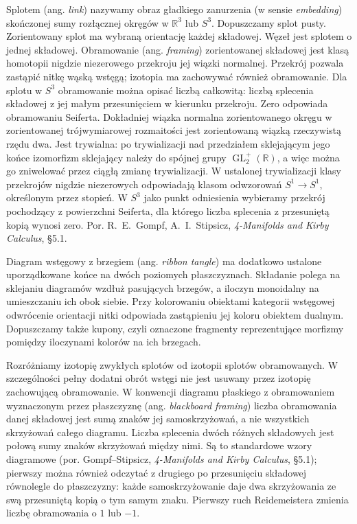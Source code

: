 \begin{definicja}\label{cat:def:tf-framed-tangle}
Splotem (ang. \emph{link}) nazywamy obraz gładkiego zanurzenia (w sensie \emph{embedding}) skończonej sumy rozłącznej okręgów w $\mathbb R^3$ lub $S^3$. Dopuszczamy splot pusty. Zorientowany splot ma wybraną orientację każdej składowej. Węzeł jest splotem o jednej składowej. Obramowanie (ang. \emph{framing}) zorientowanej składowej jest klasą homotopii nigdzie niezerowego przekroju jej wiązki normalnej. Przekrój pozwala zastąpić nitkę wąską wstęgą; izotopia ma zachowywać również obramowanie. Dla splotu w $S^3$ obramowanie można opisać liczbą całkowitą: liczbą splecenia składowej z jej małym przesunięciem w kierunku przekroju. Zero odpowiada obramowaniu Seiferta. Dokładniej wiązka normalna zorientowanego okręgu w zorientowanej trójwymiarowej rozmaitości jest zorientowaną wiązką rzeczywistą rzędu dwa. Jest trywialna: po trywializacji nad przedziałem sklejającym jego końce izomorfizm sklejający należy do spójnej grupy $\operatorname{GL}^+_2(\mathbb R)$, a więc można go zniwelować przez ciągłą zmianę trywializacji. W ustalonej trywializacji klasy przekrojów nigdzie niezerowych odpowiadają klasom odwzorowań $S^1\to S^1$, określonym przez stopień. W $S^3$ jako punkt odniesienia wybieramy przekrój pochodzący z powierzchni Seiferta, dla którego liczba splecenia z przesuniętą kopią wynosi zero. Por. R.~E.~Gompf, A.~I.~Stipsicz, \emph{4-Manifolds and Kirby Calculus}, \S5.1.

Diagram wstęgowy z brzegiem (ang. \emph{ribbon tangle}) ma dodatkowo ustalone uporządkowane końce na dwóch poziomych płaszczyznach. Składanie polega na sklejaniu diagramów wzdłuż pasujących brzegów, a iloczyn monoidalny na umieszczaniu ich obok siebie. Przy kolorowaniu obiektami kategorii wstęgowej odwrócenie orientacji nitki odpowiada zastąpieniu jej koloru obiektem dualnym. Dopuszczamy także kupony, czyli oznaczone fragmenty reprezentujące morfizmy pomiędzy iloczynami kolorów na ich brzegach.
\end{definicja}

Rozróżniamy izotopię zwykłych splotów od izotopii splotów obramowanych. W szczególności pełny dodatni obrót wstęgi nie jest usuwany przez izotopię zachowującą obramowanie. W konwencji diagramu płaskiego z obramowaniem wyznaczonym przez płaszczyznę (ang. \emph{blackboard framing}) liczba obramowania danej składowej jest sumą znaków jej samoskrzyżowań, a nie wszystkich skrzyżowań całego diagramu. Liczba splecenia dwóch różnych składowych jest połową sumy znaków skrzyżowań między nimi. Są to standardowe wzory diagramowe (por. Gompf--Stipsicz, \emph{4-Manifolds and Kirby Calculus}, \S5.1); pierwszy można również odczytać z drugiego po przesunięciu składowej równolegle do płaszczyzny: każde samoskrzyżowanie daje dwa skrzyżowania ze swą przesuniętą kopią o tym samym znaku. Pierwszy ruch Reidemeistera zmienia liczbę obramowania o $1$ lub $-1$.

